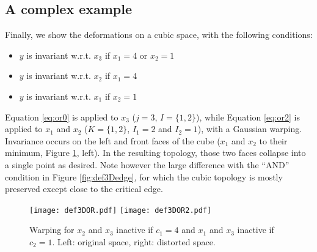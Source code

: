 \documentclass[a4paper,10pt]{article}
\begin{document}
\subsection{A complex example}
Finally, we show the deformations on a cubic space, with the following conditions:
\begin{itemize}
 \item $y$ is invariant w.r.t. $x_3$ if $x_1=4$ or $x_2=1$
 \item $y$ is invariant w.r.t. $x_2$ if $x_1=4$ 
 \item $y$ is invariant w.r.t. $x_1$ if $x_2=1$ 
\end{itemize}
Equation \ref{eq:or0} is applied to $x_3$ ($j=3$, $I=\{1,2\}$), while Equation \ref{eq:or2} is applied to $x_1$ and $x_2$ ($K=\{1,2\}$,
$I_1=2$ and $I_2=1$), with a Gaussian warping.
Invariance occurs on the left and front faces of the cube ($x_1$ and $x_2$ to their minimum, Figure \ref{fig:def3D2faces}, left).
In the resulting topology, those two faces collapse into a single point as desired. 
Note however the large difference with the ``AND'' condition in Figure \ref{fig:def3Dedge}, for which the 
cubic topology is mostly preserved except close to the critical edge.

 \begin{figure}[!ht]
 \centering
 \texttt{[image: def3DOR.pdf]}
 \texttt{[image: def3DOR2.pdf]}
 \caption{Warping for $x_2$ and $x_3$ inactive if $c_1=4$ and $x_1$ and $x_3$ inactive if $c_2=1$. Left: original space, right: distorted space. }\label{fig:def3D2faces}
\end{figure}
\end{document}
